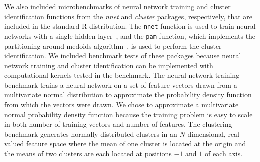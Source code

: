 We also included microbenchmarks of neural network training and cluster identification
functions from the \textit{nnet} and \textit{cluster} packages, respectively, that are
included in the standard R distribution. The \texttt{nnet} function is used to train
neural networks with a single hidden layer~\cite{ripley:pattern96}, and the \texttt{pam}
function, which implements the partitioning around medoids algorithm~\cite{chu:kmedoids,
reynolds:clustering}, is used to perform the cluster identification. We included benchmark
tests of these packages because neural network training and cluster identification can be
implemented with computational kernels tested in the benchmark. The neural network
training benchmark trains a neural network on a set of feature vectors drawn from a
multivariate normal distribution to approximate the probability density function from
which the vectors were drawn. We chose to approximate a multivariate normal probability
density function because the training problem is easy to scale in both number of training
vectors and number of features. The clustering benchmark generates normally distributed
clusters in an $N$-dimensional, real-valued feature space where the mean of one cluster is
located at the origin and the means of two clusters are each located at positions $-1$ and
$1$ of each axis.

